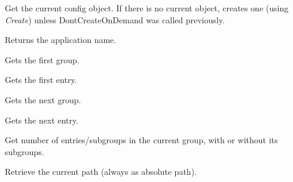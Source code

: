 
Get the current config object. If there is no current object, creates one
(using {\it Create}) unless DontCreateOnDemand was called previously.

\label{wxconfigbasegetappname}


Returns the application name.

\label{wxconfigbasegetfirstgroup}


Gets the first group.

\label{wxconfigbasegetfirstentry}


Gets the first entry.

\label{wxconfigbasegetnextgroup}


Gets the next group.

\label{wxconfigbasegetnextentry}


Gets the next entry.

\label{wxconfigbasegetnumberofentries}


\label{wxconfigbasegetnumberofgroups}


Get number of entries/subgroups in the current group, with or without its
subgroups.

\label{wxconfigbasegetpath}


Retrieve the current path (always as absolute path).

